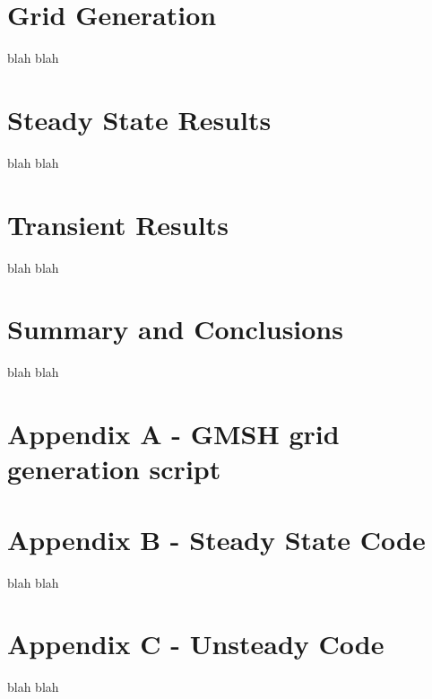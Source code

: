 \documentclass[11pt]{article}
\begin{document}
\section{Grid Generation}
\label{sec:org889dec9}
blah blah \cite{versteeg1995introduction}  
\section{Steady State Results}
\label{sec:org01e5289}
blah blah
\section{Transient Results}
\label{sec:org1ef16e2}
blah blah
\section{Summary and Conclusions}
\label{sec:org1051a86}
blah blah 
\newpage
\section{Appendix A - GMSH grid generation script}
\label{sec:orge51f918}
\section{Appendix B - Steady State Code}
\label{sec:orgd8f4e75}
blah blah
\newpage
\section{Appendix C - Unsteady Code}
\label{sec:org7b80417}
blah blah   



\end{document}

